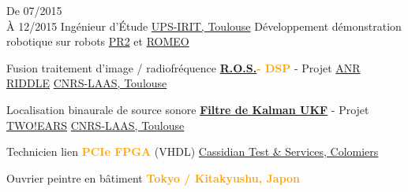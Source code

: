 \documentclass[
	a4paper,
	subsectioncolor=cvblue!70,
]{fortysecondscv}
\newcommand{\ros}{\href{http://www.ros.org/}{R.O.S.}}
\newcommand{\hl}[1]{\textbf{\textcolor{orange}{#1}}}
\begin{document}
\begin{cvtable}[2]
	\cvitem
      {De 07/2015\\À 12/2015}
      {Ingénieur d'Étude}
      {\href{https://www.irit.fr/?lang=fr}{UPS-IRIT, Toulouse}}
  {
    Développement démonstration robotique sur robots
    \href{http://www.willowgarage.com/pages/pr2/overview}{PR2} et
      \href{https://spectrum.ieee.org/automaton/robotics/humanoids/aldebaran-robotics-introduces-romeo-finally}{ROMEO}
  }
\end{cvtable}

\begin{cvtable}[2]
  {
    Fusion traitement d'image / radiofréquence\newline
    \hl{\ros - DSP} - Projet
    \href{http://www.agence-nationale-recherche.fr/Project-ANR-12-CORD-0003}{ANR
      RIDDLE}
  }
  {\href{https://www.laas.fr/public/fr}{CNRS-LAAS, Toulouse}}
  {}

  {
    Localisation binaurale de source sonore\newline
    \hl{\href{https://en.wikipedia.org/wiki/Kalman_filter\#Unscented_Kalman_filter}{Filtre de Kalman UKF}} - Projet \href{http://twoears.eu/}{TWO!EARS}
  }
  {\href{https://www.laas.fr/public/fr}{CNRS-LAAS, Toulouse}}
  {}

  {Technicien lien \hl{PCIe FPGA} (VHDL)}
  {\href{http://www.spherea.com/fr}{Cassidian Test \& Services, Colomiers}}
  {}

  {Ouvrier peintre en bâtiment}
  {\hl{Tokyo / Kitakyushu, Japon}}
  {}

\end{cvtable}



\end{document}
